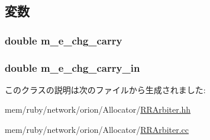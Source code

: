 \subsection{変数}
\hypertarget{classRRArbiter_aa1a5911d89a454e02f2f20019d44d2cf}{
\subsubsection[{m\_\-e\_\-chg\_\-carry}]{\setlength{\rightskip}{0pt plus 5cm}double {\bf m\_\-e\_\-chg\_\-carry}}}
\label{classRRArbiter_aa1a5911d89a454e02f2f20019d44d2cf}
\hypertarget{classRRArbiter_aeb10b57399d5501679bdb3cdaf33af92}{
\subsubsection[{m\_\-e\_\-chg\_\-carry\_\-in}]{\setlength{\rightskip}{0pt plus 5cm}double {\bf m\_\-e\_\-chg\_\-carry\_\-in}}}
\label{classRRArbiter_aeb10b57399d5501679bdb3cdaf33af92}


このクラスの説明は次のファイルから生成されました:\begin{DoxyCompactItemize}
\item 
mem/ruby/network/orion/Allocator/\hyperlink{RRArbiter_8hh}{RRArbiter.hh}\item 
mem/ruby/network/orion/Allocator/\hyperlink{RRArbiter_8cc}{RRArbiter.cc}\end{DoxyCompactItemize}
